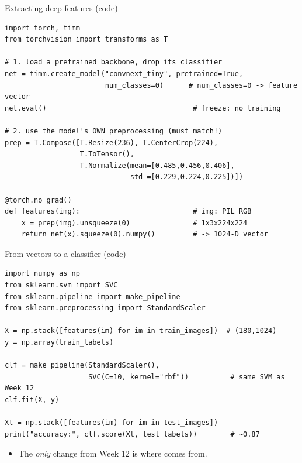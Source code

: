 \documentclass[10pt,aspectratio=169]{beamer}
\begin{document}
\begin{frame}[fragile]{Extracting deep features (code)}
\begin{lstlisting}
import torch, timm
from torchvision import transforms as T

# 1. load a pretrained backbone, drop its classifier
net = timm.create_model("convnext_tiny", pretrained=True,
                        num_classes=0)      # num_classes=0 -> feature vector
net.eval()                                   # freeze: no training

# 2. use the model's OWN preprocessing (must match!)
prep = T.Compose([T.Resize(236), T.CenterCrop(224),
                  T.ToTensor(),
                  T.Normalize(mean=[0.485,0.456,0.406],
                              std =[0.229,0.224,0.225])])

@torch.no_grad()
def features(img):                           # img: PIL RGB
    x = prep(img).unsqueeze(0)               # 1x3x224x224
    return net(x).squeeze(0).numpy()         # -> 1024-D vector
\end{lstlisting}
\end{frame}

\begin{frame}[fragile]{From vectors to a classifier (code)}
\begin{lstlisting}
import numpy as np
from sklearn.svm import SVC
from sklearn.pipeline import make_pipeline
from sklearn.preprocessing import StandardScaler

X = np.stack([features(im) for im in train_images])  # (180,1024)
y = np.array(train_labels)

clf = make_pipeline(StandardScaler(),
                    SVC(C=10, kernel="rbf"))          # same SVM as Week 12
clf.fit(X, y)

Xt = np.stack([features(im) for im in test_images])
print("accuracy:", clf.score(Xt, test_labels))        # ~0.87
\end{lstlisting}
  \begin{itemize}
    \item The \emph{only} change from Week 12 is where  comes from.
  \end{itemize}
\end{frame}
\end{document}
